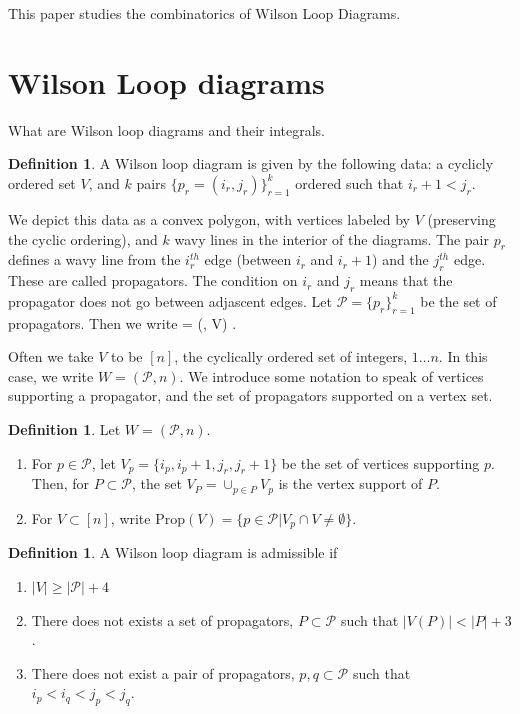 \documentclass[11pt]{article}
\def\bas #1\eas{\begin{align*} #1 \end{align*}}
\newcommand{\cP}{\mathcal{P}}
\newcommand{\Prop}{\textrm{Prop}}
\theoremstyle{remark}
\theoremstyle{definition}
\newtheorem{dfn}[thm]{Definition}
\begin{document}
This paper studies the combinatorics of Wilson Loop Diagrams.
\section{Wilson Loop diagrams}

What are Wilson loop diagrams and their integrals.

\begin{dfn}\label{WLdfn}
A Wilson loop diagram is given by the following data: a cyclicly ordered set $V$, and $k$ pairs $\{p_r = (i_r, j_r)\}_{r=1}^k$ ordered such that $i_r +1 < j_r$. \end{dfn}

We depict this data as a convex polygon, with vertices labeled by $V$ (preserving the cyclic ordering), and $k$ wavy lines in the interior of the diagrams. The pair $p_r$ defines a wavy line from the $i_r^{th}$ edge (between $i_r$ and $i_r+1$) and the $j_r^{th}$ edge. These are called propagators.  The condition on $i_r$ and $j_r$ means that the propagator does not go between adjascent edges. Let $\cP = \{p_r\}_{r=1}^k$ be the set of propagators. Then we write \bas W = (\cP, V) \;.\eas

Often we take $V$ to be $[n]$, the cyclically ordered set of integers, $1 \ldots n$. In this case, we write $W = (\cP, n)$. We introduce some notation to speak of vertices supporting a propagator, and the set of propagators supported on a vertex set.

\begin{dfn} \label{VPropdfn}
Let $W = (\cP, n)$.
\begin{enumerate}
\item For $p \in \cP$, let $V_p = \{i_p, i_p+1, j_r, j_r+1\}$ be the set of vertices supporting $p$. Then, for $P \subset \cP$, the set $V_P = \cup_{p \in P} V_p$ is the vertex support of $P$.
\item For $V \subset [n]$, write $\Prop(V) = \{ p \in \cP | V_p \cap V \neq \emptyset \} $.
\end{enumerate}
\end{dfn}

\begin{dfn}\label{admisdfn}
A Wilson loop diagram is admissible if \begin{enumerate}
\item $|V| \geq |\cP| + 4$
\item There does not exists a set of propagators, $P \subset \cP$ such that $|V(P)| < |P| + 3$.
\item There does not exist a pair of propagators, $p, q \subset \cP$ such that $i_p < i_q < j_p <j_q$.
\end{enumerate}
 \end{dfn}
\end{document}

